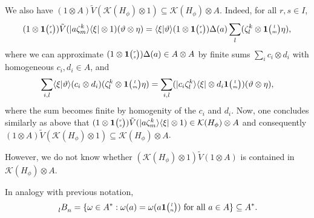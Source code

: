 \begin{Rem}
  We also have $(1 \otimes A)\tilde V(\mathcal{K}(H_{\phi})\otimes 1)
  \subseteq \mathcal{K}(H_{\phi}) \otimes A$. Indeed, for all $r,s\in I$,
   \begin{align*}
     (1 \otimes \mathbf{1}{\tiny {\begin{pmatrix} r\\s\end{pmatrix}}})\tilde
     V(|a\zeta^{k}_{m}\rangle\langle\xi|\otimes 1)(\vartheta \otimes
     \eta) = \langle \xi|\vartheta \rangle(1 \otimes
     \mathbf{1}{\tiny {\begin{pmatrix} r\\s\end{pmatrix}}})\Delta(a) \sum_{l} (\zeta^{k}_{l} \otimes
     \mathbf{1}{\tiny {\begin{pmatrix} l\\m\end{pmatrix}}}\eta),
   \end{align*}
where we can approximate $(1
   \otimes \mathbf{1}{\tiny {\begin{pmatrix} r\\s\end{pmatrix}}})\Delta(a) \in A\otimes A$ by finite sums
   $\sum_{i} c_{i} \otimes d_{i}$ with homogeneous $c_{i},d_{i} \in
   A$, and
   \begin{align*}
     \sum_{i,l} \langle \xi|\vartheta\rangle (c_{i} \otimes d_{i})(\zeta^{k}_{l} \otimes
     \mathbf{1}{\tiny {\begin{pmatrix} l\\m\end{pmatrix}}} \eta) = \sum_{i,l} (|c_{i}\zeta^{k}_{l}\rangle\langle \xi| \otimes
     d_{i}\mathbf{1}{\tiny {\begin{pmatrix} l\\m\end{pmatrix}}}) (\vartheta \otimes \eta),
   \end{align*}
   where the sum becomes finite by homogenity of the $c_{i}$ and $d_{i}$. Now, one concludes   similarly as above that $(1 \otimes \mathbf{1}{\tiny {\begin{pmatrix} r\\s\end{pmatrix}}})\tilde
   V(|a\zeta^{k}_{m}\rangle\langle\xi|\otimes 1) \in \mathcal{K}(H_{\phi}) \otimes A$ and consequently
   $(1\otimes A)\tilde V(\mathcal{K}(H_{\phi}) \otimes 1) \subseteq \mathcal{K}(H_{\phi}) \otimes A$.
  
However,   we do not know whether $(\mathcal{K}(H_{\phi}) \otimes 1)
   \tilde V(1\otimes A)$ is contained in $\mathcal{K}(H_{\phi})\otimes A$.%
\end{Rem}

In analogy with previous notation,
\begin{align*}
  \Grd{B}{l}{n}  =\{ \omega \in A^{*} : \omega(a)=\omega(a\UnitC{l}{n}) \text{ for all  }a\in A\} \subseteq A^{*}.
\end{align*}

